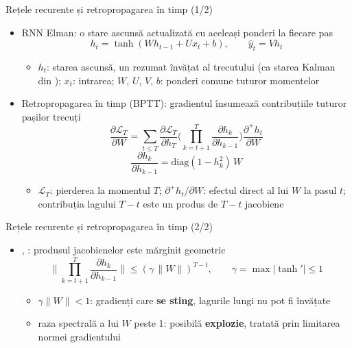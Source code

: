 \begin{frame}{Rețele recurente și retropropagarea în timp (1/2)}
\itemsize{\small}
\begin{itemize}
    \item RNN Elman: o stare ascunsă actualizată cu aceleași ponderi la fiecare pas
    \[ h_t = \tanh(W h_{t-1} + U x_t + b), \qquad \hat y_t = V h_t \]
    \begin{itemize}
        \item $h_t$: starea ascunsă, un rezumat învățat al trecutului (ca starea Kalman din ); $x_t$: intrarea; $W$, $U$, $V$, $b$: ponderi comune tuturor momentelor
    \end{itemize}
    \item Retropropagarea în timp (BPTT): gradientul însumează contribuțiile tuturor pașilor trecuți
    \[ \frac{\partial\mathcal L_T}{\partial W} = \sum_{t\le T}\frac{\partial\mathcal L_T}{\partial h_T}\Big(\prod_{k=t+1}^T\frac{\partial h_k}{\partial h_{k-1}}\Big)\frac{\partial^+ h_t}{\partial W} \]
    \[ \frac{\partial h_k}{\partial h_{k-1}} = \mathrm{diag}(1 - h_k^2)\,W \]
    \begin{itemize}
        \item $\mathcal L_T$: pierderea la momentul $T$; $\partial^+h_t/\partial W$: efectul direct al lui $W$ la pasul $t$; contribuția lagului $T - t$ este un produs de $T - t$ jacobiene
    \end{itemize}
\end{itemize}
\end{frame}

\begin{frame}{Rețele recurente și retropropagarea în timp (2/2)}
\itemsize{\small}
\begin{itemize}
    \item {}, : produsul jacobienelor este mărginit geometric
    \[ \Big\|\prod_{k=t+1}^T\frac{\partial h_k}{\partial h_{k-1}}\Big\| \le (\gamma\,\|W\|)^{T-t}, \qquad \gamma = \max|\tanh'| \le 1 \]
    \begin{itemize}
        \item $\gamma\|W\| < 1$: gradienți care \textbf{se sting}, lagurile lungi nu pot fi învățate
        \item raza spectrală a lui $W$ peste 1: posibilă \textbf{explozie}, tratată prin limitarea normei gradientului
    \end{itemize}
\end{itemize}
\end{frame}

